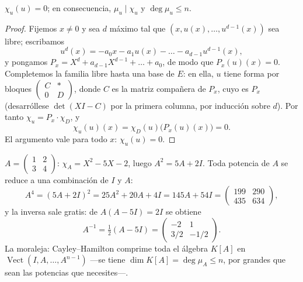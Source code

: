 \begin{theorem}\label{thm:b2:reduction:cayleyhamilton}
$\chi_u(u) = 0$; en consecuencia, $\mu_u \mid \chi_u$ y $\deg \mu_u
\leq n$.
\end{theorem}

\begin{proof}
Fijemos $x \neq 0$ y sea $d$ máximo tal que $(x, u(x), \dots,
u^{d-1}(x))$ sea libre; escribamos
\[
u^d(x) = -a_0 x - a_1 u(x) - \dots - a_{d-1}u^{d-1}(x),
\]
y pongamos $P_x = X^d + a_{d-1}X^{d-1} + \dots + a_0$, de modo que
$P_x(u)(x) = 0$. Completemos la familia libre hasta una base de $E$:
en ella, $u$ tiene forma por bloques $\begin{pmatrix} C & \ast\\ 0 &
D\end{pmatrix}$, donde $C$ es la matriz compañera de $P_x$, cuyo
 es $P_x$ (desarróllese $\det(XI - C)$ por
la primera columna, por inducción sobre $d$). Por tanto $\chi_u = P_x
\cdot \chi_D$, y
\[
\chi_u(u)(x) = \chi_D(u)\bigl(P_x(u)(x)\bigr) = 0 .
\]
El argumento vale para todo $x$: $\chi_u(u) = 0$.
\end{proof}

\begin{example}\label{ex:b2:reduction:chwork}
$A = \begin{pmatrix} 1 & 2\\ 3 & 4\end{pmatrix}$: $\chi_A = X^2 - 5X
- 2$, luego $A^2 = 5A + 2I$. Toda potencia de $A$ se reduce a una
combinación de $I$ y $A$:
\[
A^4 = (5A + 2I)^2 = 25A^2 + 20A + 4I = 145A + 54I =
\begin{pmatrix} 199 & 290\\ 435 & 634\end{pmatrix},
\]
y la inversa sale gratis: de $A(A - 5I) = 2I$ se obtiene
\[
A^{-1} = \tfrac12(A - 5I)
= \begin{pmatrix} -2 & 1\\ 3/2 & -1/2\end{pmatrix}.
\]
La moraleja: Cayley--Hamilton comprime toda el álgebra $K[A]$ en
$\operatorname{Vect}(I, A, \dots, A^{n-1})$ ---se tiene $\dim K[A] =
\deg\mu_A \leq n$, por grandes que sean las potencias que
necesites---.
\end{example}

